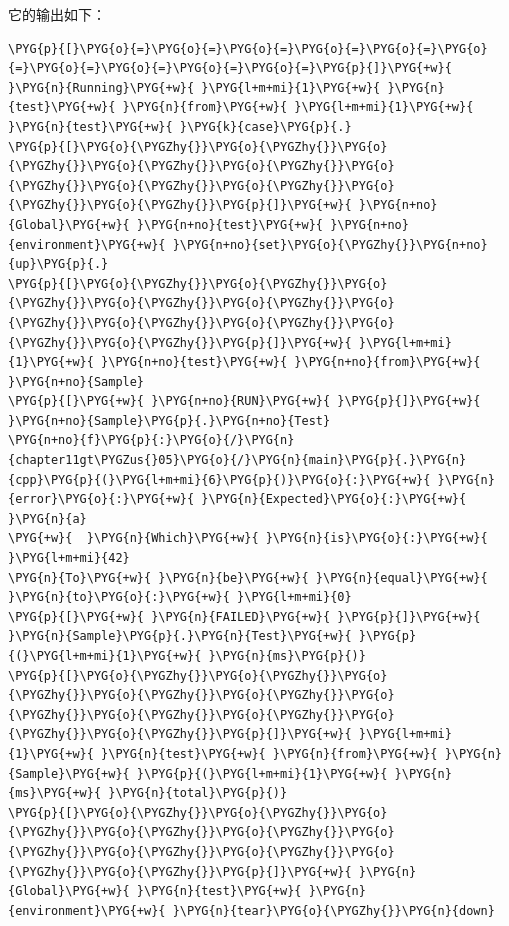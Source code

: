 
它的输出如下：



\begin{codeblockbg}
\begin{Verbatim}[commandchars=\\\{\},breaklines=true,breakanywhere=true,fontsize=\codefont,xleftmargin=17bp]
\PYG{p}{[}\PYG{o}{=}\PYG{o}{=}\PYG{o}{=}\PYG{o}{=}\PYG{o}{=}\PYG{o}{=}\PYG{o}{=}\PYG{o}{=}\PYG{o}{=}\PYG{o}{=}\PYG{p}{]}\PYG{+w}{ }\PYG{n}{Running}\PYG{+w}{ }\PYG{l+m+mi}{1}\PYG{+w}{ }\PYG{n}{test}\PYG{+w}{ }\PYG{n}{from}\PYG{+w}{ }\PYG{l+m+mi}{1}\PYG{+w}{ }\PYG{n}{test}\PYG{+w}{ }\PYG{k}{case}\PYG{p}{.}
\PYG{p}{[}\PYG{o}{\PYGZhy{}}\PYG{o}{\PYGZhy{}}\PYG{o}{\PYGZhy{}}\PYG{o}{\PYGZhy{}}\PYG{o}{\PYGZhy{}}\PYG{o}{\PYGZhy{}}\PYG{o}{\PYGZhy{}}\PYG{o}{\PYGZhy{}}\PYG{o}{\PYGZhy{}}\PYG{o}{\PYGZhy{}}\PYG{p}{]}\PYG{+w}{ }\PYG{n+no}{Global}\PYG{+w}{ }\PYG{n+no}{test}\PYG{+w}{ }\PYG{n+no}{environment}\PYG{+w}{ }\PYG{n+no}{set}\PYG{o}{\PYGZhy{}}\PYG{n+no}{up}\PYG{p}{.}
\PYG{p}{[}\PYG{o}{\PYGZhy{}}\PYG{o}{\PYGZhy{}}\PYG{o}{\PYGZhy{}}\PYG{o}{\PYGZhy{}}\PYG{o}{\PYGZhy{}}\PYG{o}{\PYGZhy{}}\PYG{o}{\PYGZhy{}}\PYG{o}{\PYGZhy{}}\PYG{o}{\PYGZhy{}}\PYG{o}{\PYGZhy{}}\PYG{p}{]}\PYG{+w}{ }\PYG{l+m+mi}{1}\PYG{+w}{ }\PYG{n+no}{test}\PYG{+w}{ }\PYG{n+no}{from}\PYG{+w}{ }\PYG{n+no}{Sample}
\PYG{p}{[}\PYG{+w}{ }\PYG{n+no}{RUN}\PYG{+w}{ }\PYG{p}{]}\PYG{+w}{ }\PYG{n+no}{Sample}\PYG{p}{.}\PYG{n+no}{Test}
\PYG{n+no}{f}\PYG{p}{:}\PYG{o}{/}\PYG{n}{chapter11gt\PYGZus{}05}\PYG{o}{/}\PYG{n}{main}\PYG{p}{.}\PYG{n}{cpp}\PYG{p}{(}\PYG{l+m+mi}{6}\PYG{p}{)}\PYG{o}{:}\PYG{+w}{ }\PYG{n}{error}\PYG{o}{:}\PYG{+w}{ }\PYG{n}{Expected}\PYG{o}{:}\PYG{+w}{ }\PYG{n}{a}
\PYG{+w}{  }\PYG{n}{Which}\PYG{+w}{ }\PYG{n}{is}\PYG{o}{:}\PYG{+w}{ }\PYG{l+m+mi}{42}
\PYG{n}{To}\PYG{+w}{ }\PYG{n}{be}\PYG{+w}{ }\PYG{n}{equal}\PYG{+w}{ }\PYG{n}{to}\PYG{o}{:}\PYG{+w}{ }\PYG{l+m+mi}{0}
\PYG{p}{[}\PYG{+w}{ }\PYG{n}{FAILED}\PYG{+w}{ }\PYG{p}{]}\PYG{+w}{ }\PYG{n}{Sample}\PYG{p}{.}\PYG{n}{Test}\PYG{+w}{ }\PYG{p}{(}\PYG{l+m+mi}{1}\PYG{+w}{ }\PYG{n}{ms}\PYG{p}{)}
\PYG{p}{[}\PYG{o}{\PYGZhy{}}\PYG{o}{\PYGZhy{}}\PYG{o}{\PYGZhy{}}\PYG{o}{\PYGZhy{}}\PYG{o}{\PYGZhy{}}\PYG{o}{\PYGZhy{}}\PYG{o}{\PYGZhy{}}\PYG{o}{\PYGZhy{}}\PYG{o}{\PYGZhy{}}\PYG{o}{\PYGZhy{}}\PYG{p}{]}\PYG{+w}{ }\PYG{l+m+mi}{1}\PYG{+w}{ }\PYG{n}{test}\PYG{+w}{ }\PYG{n}{from}\PYG{+w}{ }\PYG{n}{Sample}\PYG{+w}{ }\PYG{p}{(}\PYG{l+m+mi}{1}\PYG{+w}{ }\PYG{n}{ms}\PYG{+w}{ }\PYG{n}{total}\PYG{p}{)}
\PYG{p}{[}\PYG{o}{\PYGZhy{}}\PYG{o}{\PYGZhy{}}\PYG{o}{\PYGZhy{}}\PYG{o}{\PYGZhy{}}\PYG{o}{\PYGZhy{}}\PYG{o}{\PYGZhy{}}\PYG{o}{\PYGZhy{}}\PYG{o}{\PYGZhy{}}\PYG{o}{\PYGZhy{}}\PYG{o}{\PYGZhy{}}\PYG{p}{]}\PYG{+w}{ }\PYG{n}{Global}\PYG{+w}{ }\PYG{n}{test}\PYG{+w}{ }\PYG{n}{environment}\PYG{+w}{ }\PYG{n}{tear}\PYG{o}{\PYGZhy{}}\PYG{n}{down}

\end{Verbatim}
\end{codeblockbg}
